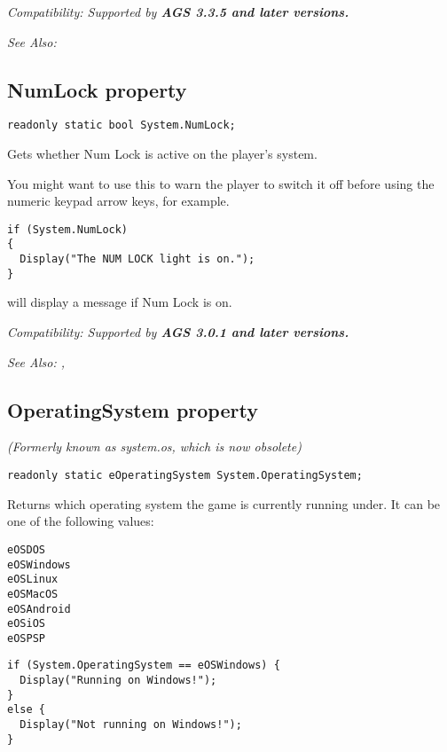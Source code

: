 \it{Compatibility:} Supported by \bf{AGS 3.3.5} and later versions.

\it{See Also:} 


\subsection{NumLock property}\label{System.NumLock}%

\begin{verbatim}
readonly static bool System.NumLock;
\end{verbatim}
Gets whether Num Lock is active on the player's system.

You might want to use this to warn the player to switch it off before using
the numeric keypad arrow keys, for example.

\begin{verbatim}
if (System.NumLock)
{
  Display("The NUM LOCK light is on.");
}
\end{verbatim}
will display a message if Num Lock is on.

\it{Compatibility:} Supported by \bf{AGS 3.0.1} and later versions.

\it{See Also:} ,


\subsection{OperatingSystem property}\label{System.OperatingSystem}%

\it{(Formerly known as system.os, which is now obsolete)}

\begin{verbatim}
readonly static eOperatingSystem System.OperatingSystem;
\end{verbatim}
Returns which operating system the game is currently running under. It can be one of
the following values:
\begin{verbatim}
eOSDOS
eOSWindows
eOSLinux
eOSMacOS
eOSAndroid
eOSiOS
eOSPSP
\end{verbatim}

\begin{verbatim}
if (System.OperatingSystem == eOSWindows) {
  Display("Running on Windows!");
}
else {
  Display("Not running on Windows!");
}
\end{verbatim}


